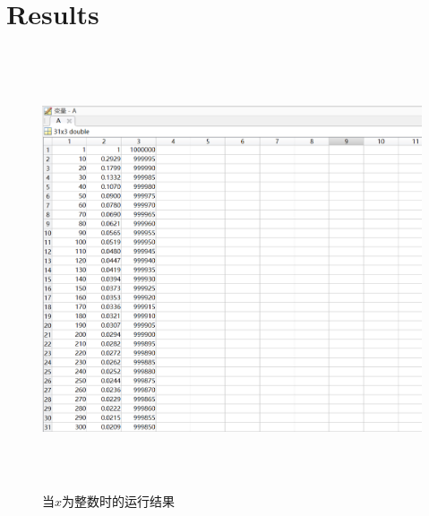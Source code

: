 \documentclass{article}
\begin{document}
	\section{Results}
	
  
	
	\begin{figure}[htb]
		\begin{center}
			
			\includegraphics[width=12cm,height=13cm]{int1}
		
			\caption{当$x$为整数时的运行结果} \label{figure.label}
		\end{center}
	\end{figure}
\end{document}
